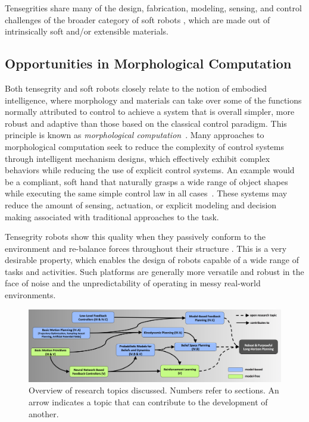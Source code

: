 Tensegrities share many of the design, fabrication, modeling, sensing,
and control challenges of the broader category of soft robots
\cite{Pfeifer:2012aa, Kim:2013aa, Majidi:2014aa},
which are made out of intrinsically soft and/or extensible
materials. 

\subsection{Opportunities in Morphological Computation}


Both tensegrity and soft robots closely relate to the notion of
embodied intelligence, where morphology and materials can take over
some of the functions normally attributed to control to achieve a
system that is overall simpler, more robust and adaptive than those
based on the classical control paradigm. This principle
is known as \emph{morphological computation}~\cite{Pfeifer:2012aa,
Hauser}.  Many approaches to morphological
computation \cite{Zambrano:2014aa, Hauser} seek to reduce the
complexity of control systems through intelligent mechanism designs,
which effectively exhibit complex behaviors while reducing the use of
explicit control systems.  An example would be a compliant, soft hand
that naturally grasps a wide range of object shapes while executing
the same simple control law in all cases~\cite{Deimel:2015aa}.  These
systems may reduce the amount of sensing, actuation, or explicit
modeling and decision making associated with traditional approaches to
the task.

Tensegrity robots show this quality when they passively conform to the
environment and re-balance forces throughout their
structure \cite{Khazanov:2014aa}.  This is a very desirable property,
which enables the design of robots capable of a wide range of tasks
and activities. Such platforms are generally more versatile and robust
in the face of noise and the unpredictability of operating in messy
real-world environments.


\begin{figure}[t]
\includegraphics[width = \textwidth]{tex/img/review_overview_fig.png}
\vspace{-.2in}
\caption{Overview of research topics discussed. Numbers refer to
sections. An arrow indicates a topic that can contribute to the
development of another.  }
\vspace{-.2in}
\label{fig:overview}
\end{figure}

